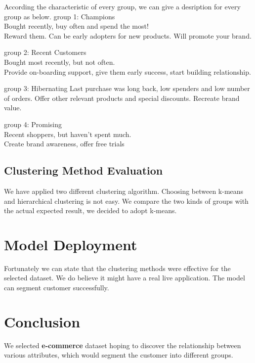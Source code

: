According the characteristic of every group, we can give a desription
for every group as below. group 1: Champions\\
Bought recently, buy often and spend the most!\\
Reward them. Can be early adopters for new products. Will promote your
brand.

group 2: Recent Customers\\
Bought most recently, but not often.\\
Provide on-boarding support, give them early success, start building
relationship.

group 3: Hibernating Last purchase was long back, low spenders and low
number of orders. Offer other relevant products and special discounts.
Recreate brand value.

group 4: Promising\\
Recent shoppers, but haven't spent much.\\
Create brand awareness, offer free trials

\hypertarget{clustering-method-evaluation}{%
\subsection{Clustering Method
Evaluation}\label{clustering-method-evaluation}}

We have applied two different clustering algorithm. Choosing between
k-means and hierarchical clustering is not easy. We compare the two
kinds of groups with the actual expected result, we decided to adopt
k-means.

\hypertarget{model-deployment}{%
\section{Model Deployment}\label{model-deployment}}

Fortunately we can state that the clustering methods were effective for
the selected dataset. We do believe it might have a real live
application. The model can segment customer successfully.

\hypertarget{conclusion}{%
\section{Conclusion}\label{conclusion}}

We selected \textbf{e-commerce} dataset hoping to discover the
relationship between various attributes, which would segment the
customer into different groups.

